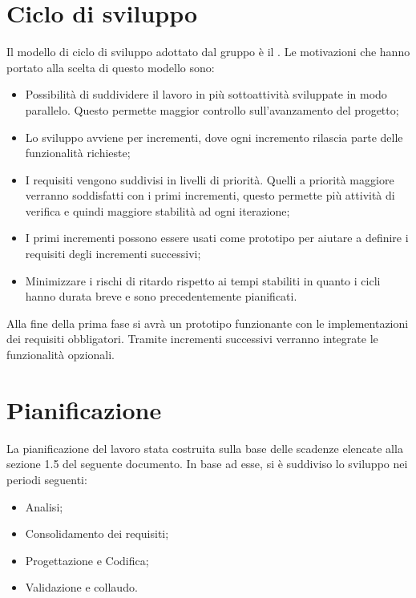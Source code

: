 \documentclass[../PianodiProgetto.tex]{subfiles}
\begin{document}
	
	\chapter{Ciclo di sviluppo}
	
	Il modello di ciclo di sviluppo adottato dal gruppo è il . Le motivazioni che hanno portato alla scelta di questo modello sono:
	\begin{itemize}
		\item Possibilità di suddividere il lavoro in più sottoattività sviluppate in modo parallelo. Questo permette maggior controllo sull’avanzamento del progetto;
		\item Lo sviluppo avviene per incrementi, dove ogni incremento rilascia parte delle funzionalità richieste;
		\item I requisiti vengono suddivisi in livelli di priorità. Quelli a priorità maggiore verranno soddisfatti con i primi incrementi, questo permette più attività di verifica e quindi maggiore stabilità ad ogni iterazione;
		\item I primi incrementi possono essere usati come prototipo per aiutare a definire i requisiti degli incrementi successivi;
		\item Minimizzare i rischi di ritardo rispetto ai tempi stabiliti in quanto i cicli hanno durata breve e sono precedentemente pianificati.
	\end{itemize}
	Alla fine della prima fase si avrà un prototipo funzionante con le implementazioni dei requisiti obbligatori. Tramite incrementi successivi verranno integrate le funzionalità opzionali.
	
	\chapter{Pianificazione}
	
	La pianificazione del lavoro stata costruita sulla base delle scadenze elencate alla sezione 1.5 del seguente documento. In base ad esse, si è suddiviso lo sviluppo nei periodi seguenti:
	\begin{itemize}
		\item Analisi;
		\item Consolidamento dei requisiti;
		\item Progettazione e Codifica;
		\item Validazione e collaudo.
	\end{itemize}
\end{document}
